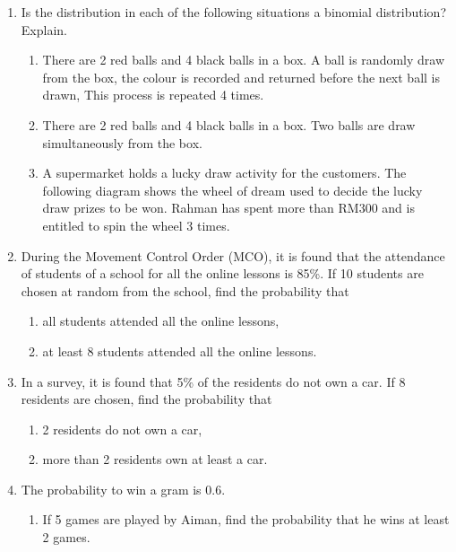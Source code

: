 \documentclass{report}
\begin{document}
\begin{multicols*}{2}
\begin{enumerate}
        \item Is the distribution in each of the following situations a binomial
              distribution? Explain.
              \begin{enumerate}
                  \item There are 2 red balls and 4 black balls in a box. A ball is randomly draw from
                        the box, the colour is recorded and returned before the next ball is drawn,
                        This process is repeated 4 times.

                  \item There are 2 red balls and 4 black balls in a box. Two balls are draw
                        simultaneously from the box.

                  \item A supermarket holds a lucky draw activity for the customers. The following
                        diagram shows the wheel of dream used to decide the lucky draw prizes to be
                        won. Rahman has spent more than RM300 and is entitled to spin the wheel 3
                        times.
              \end{enumerate}

        \item During the Movement Control Order (MCO), it is found that the attendance of
              students of a school for all the online lessons is 85\%. If 10 students are
              chosen at random from the school, find the probability that
              \begin{enumerate}
                  \item all students attended all the online lessons,
                  \item at least 8 students attended all the online lessons.
              \end{enumerate}

        \item In a survey, it is found that 5\% of the residents do not own a car. If 8
              residents are chosen, find the probability that
              \begin{enumerate}
                  \item 2 residents do not own a car,
                  \item more than 2 residents own at least a car.
              \end{enumerate}

        \item The probability to win a gram is 0.6.
              \begin{enumerate}
                  \item If 5 games are played by Aiman, find the probability that he wins at least 2
                        games.


\end{enumerate}
\end{enumerate}
\end{multicols*}
\end{document}
